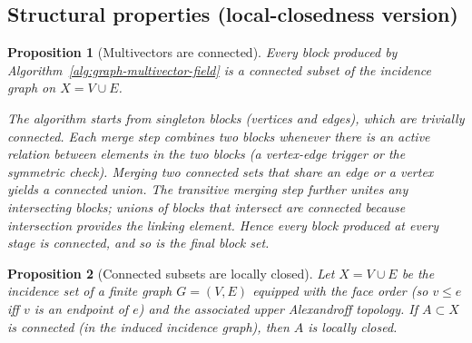 \documentclass{article}
\theoremstyle{definition}
\theoremstyle{plain}
\newtheorem{proposition}{Proposition}
\theoremstyle{remark}
\newcommand{\1}{\mathbbm{1}}  %
\renewenvironment{proof}{{\bf Proof:\ }}{\qedsymbol}%
\begin{document}
\subsection*{Structural properties (local-closedness version)}
\label{sec:properties-locallyclosed}
\begin{proposition}[Multivectors are connected]
\label{rem:multivectors-connected}
Every block produced by Algorithm~\ref{alg:graph-multivector-field} is a
connected subset of the incidence graph on \(X=V\cup E\).

\begin{proof}
The algorithm starts from singleton blocks (vertices and edges), which are
trivially connected. Each merge step combines two blocks whenever there is
an active relation between elements in the two blocks (a vertex-edge trigger
or the symmetric check). Merging two connected sets that share an edge or a
vertex yields a connected union. The transitive merging step further
unites any intersecting blocks; unions of blocks that intersect are
connected because intersection provides the linking element. Hence every
block produced at every stage is connected, and so is the final block set.
\end{proof}
\end{proposition}

\begin{proposition}[Connected subsets are locally closed]
\label{prop:connected-implies-locallyclosed}
Let \(X=V\cup E\) be the incidence set of a finite graph \(G=(V,E)\) equipped
with the face order (so \(v\le e\) iff \(v\) is an endpoint of \(e\)) and
the associated upper Alexandroff topology. If \(A\subset X\) is connected
(in the induced incidence graph), then \(A\) is locally closed.
\end{proposition}
\end{document}
